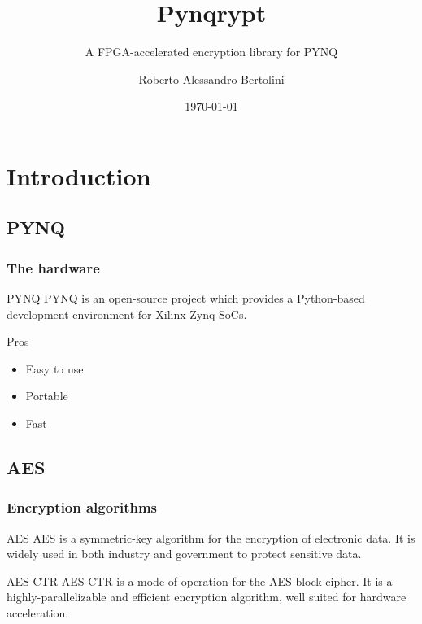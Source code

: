 \documentclass{beamer}
\title{Pynqrypt}
\author{Roberto Alessandro Bertolini}
\institute{FPGA101 - Politecnico di Milano}
\date{\today}
\subtitle{A FPGA-accelerated encryption library for PYNQ}
\begin{document}
\begin{frame}
    \titlepage
\end{frame}

\section{Introduction}

\subsection{PYNQ}
\begin{frame}
    \frametitle{The hardware}

    \begin{block}{PYNQ}
    PYNQ is an open-source project which provides a Python-based development environment for Xilinx Zynq SoCs.
    \end{block}

    \begin{exampleblock}{Pros}
        \begin{itemize}
            \item Easy to use
            \item Portable
            \item Fast
        \end{itemize}
    \end{exampleblock}
\end{frame}

\subsection{AES}
\begin{frame}
    \frametitle{Encryption algorithms}

    \begin{block}{AES}
    AES is a symmetric-key algorithm for the encryption of electronic data. It is widely used in both industry and government to protect sensitive data.
    \end{block}

    \begin{block}{AES-CTR}
    AES-CTR is a mode of operation for the AES block cipher. It is a highly-parallelizable and efficient encryption algorithm, well suited for hardware acceleration.
    \end{block}
\end{frame}
\end{document}

